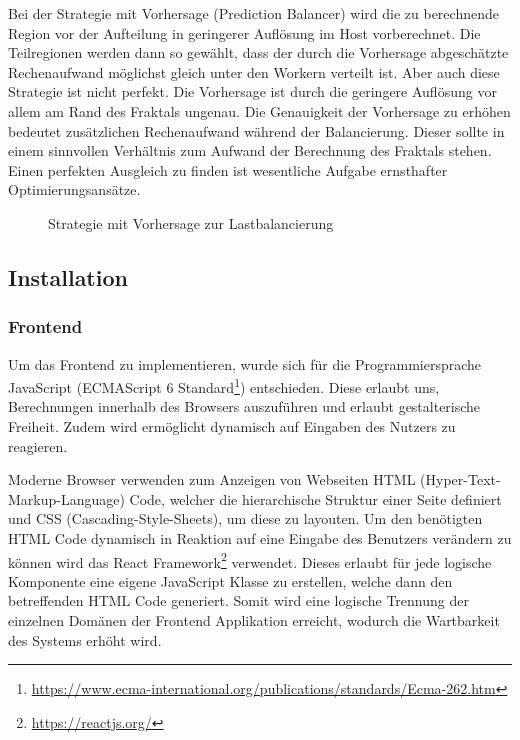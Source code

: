 Bei der Strategie mit Vorhersage (Prediction Balancer) wird die zu berechnende Region vor der Aufteilung in geringerer Auflösung im Host vorberechnet. Die Teilregionen werden dann so gewählt, dass der durch die Vorhersage abgeschätzte Rechenaufwand möglichst gleich unter den Workern verteilt ist. Aber auch diese Strategie ist nicht perfekt. Die Vorhersage ist durch die geringere Auflösung vor allem am Rand des Fraktals ungenau. Die Genauigkeit der Vorhersage zu erhöhen bedeutet zusätzlichen Rechenaufwand während der Balancierung. Dieser sollte in einem sinnvollen Verhältnis zum Aufwand der Berechnung des Fraktals stehen. Einen perfekten Ausgleich zu finden ist wesentliche Aufgabe ernsthafter Optimierungsansätze.

\begin{figure}
    \centering
        \caption{Strategie mit Vorhersage zur Lastbalancierung}
    \label{fig:lastbalanceriung_vorhersage}
\end{figure}


\subsection{Installation}

\subsubsection{Frontend}

Um das Frontend zu implementieren, wurde sich für die Programmiersprache JavaScript (ECMAScript 6 Standard\footnote{\url{https://www.ecma-international.org/publications/standards/Ecma-262.htm}}) entschieden. Diese erlaubt uns, Berechnungen innerhalb des Browsers auszuführen und erlaubt gestalterische Freiheit. Zudem wird ermöglicht dynamisch auf Eingaben des Nutzers zu reagieren.

Moderne Browser verwenden zum Anzeigen von Webseiten HTML (Hyper-Text-Markup-Language) Code, welcher die hierarchische Struktur einer Seite definiert und CSS (Cascading-Style-Sheets), um diese zu layouten. Um den benötigten HTML Code dynamisch in Reaktion auf eine Eingabe des Benutzers verändern zu können wird das React Framework\footnote{\url{https://reactjs.org/}} verwendet. Dieses erlaubt für jede logische Komponente eine eigene JavaScript Klasse zu erstellen, welche dann den betreffenden HTML Code generiert. Somit wird eine logische Trennung der einzelnen Domänen der Frontend Applikation erreicht, wodurch die Wartbarkeit des Systems erhöht wird.

